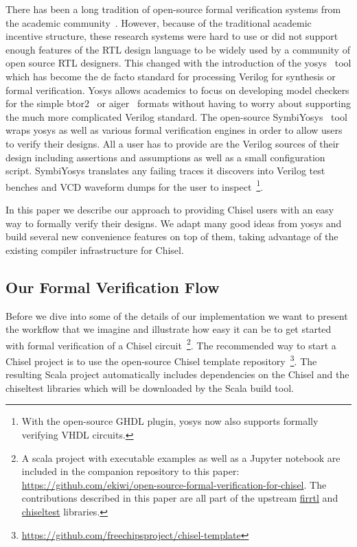 \documentclass[conference]{IEEEtran}
\begin{document}
There has been a long tradition of open-source formal verification systems from the academic community~\cite{mcmillan1993smv, cimatti2000nusmv, mishchenko2007abc}.
However, because of the traditional academic incentive structure, these research systems were hard to use or did not support
enough features of the RTL design language to be widely used by a community of open source RTL designers.
This changed with the introduction of the yosys~\cite{yosys} tool which has become the de facto standard for processing
Verilog for synthesis or formal verification.
Yosys allows academics to focus on developing model checkers for the simple btor2~\cite{btor2} or aiger~\cite{aiger} formats
without having to worry about supporting the much more complicated Verilog standard.
The open-source SymbiYosys~\cite{symbiyosys} tool wraps yosys as well as various formal verification engines in order to allow users to
verify their designs. All a user has to provide are the Verilog sources of their design including assertions and assumptions
as well as a small configuration script. SymbiYosys translates any failing traces it discovers into Verilog test benches and VCD waveform dumps
for the user to inspect~\footnote{With the open-source GHDL plugin, yosys now also supports formally verifying VHDL circuits.}.


In this paper we describe our approach to providing Chisel users with an easy way to formally verify their designs.
We adapt many good ideas from yosys and build several new convenience features on top of them, taking advantage
of the existing compiler infrastructure for Chisel.

\subsection{Our Formal Verification Flow}\label{sec:flow}


Before we dive into some of the details of our implementation we want to present
the workflow that we imagine and illustrate how easy it can be to get started
with formal verification of a Chisel circuit~\footnote{
A scala project with executable examples as well as a Jupyter notebook are included in the companion repository to this paper:
\url{https://github.com/ekiwi/open-source-formal-verification-for-chisel}.
The contributions described in this paper are all part of the upstream \href{https://github.com/chipsalliance/firrtl}{firrtl}
and \href{https://github.com/ucb-bar/chisel-testers2}{chiseltest} libraries.
}.
The recommended way to start a Chisel project is to use the open-source Chisel template 
repository~\footnote{\url{https://github.com/freechipsproject/chisel-template}}.
The resulting Scala project automatically includes dependencies on the Chisel and the chiseltest
libraries which will be downloaded by the Scala build tool.
\end{document}
